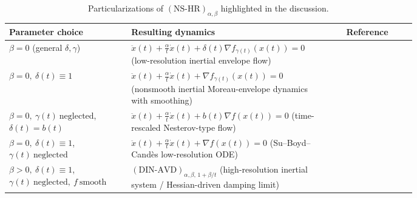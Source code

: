 \documentclass[11pt]{article}
\numberwithin{equation}{section}
\begin{document}
\begin{table}[t]
\centering
\caption{Particularizations of $(\mathrm{NS\text{-}HR})_{\alpha,\beta}$ highlighted in the discussion.}
\label{tab:particularizations_discussion}
\renewcommand{\arraystretch}{1.2}\centering
\begin{tabular}{p{0.30\linewidth} p{0.48\linewidth} c}
\hline
\textbf{Parameter choice} & \textbf{Resulting dynamics} & \textbf{Reference} \\
\hline

$\beta=0$ (general $\delta,\gamma$) 
&
$\ddot x(t)+\frac{\alpha}{t}\dot x(t)+\delta(t)\nabla f_{\gamma(t)}(x(t))=0$
(low-resolution inertial envelope flow)
& \cite{BotKarapetyants2022} \\\hline

$\beta=0,\ \delta(t)\equiv 1$ 
&
$\ddot x(t)+\frac{\alpha}{t}\dot x(t)+\nabla f_{\gamma(t)}(x(t))=0$
(nonsmooth inertial Moreau-envelope dynamics with smoothing)
& \cite{AttouchCabot2018JDE} \\ \hline

$\beta=0,\ \gamma(t)\ \text{neglected}$, \newline $\delta(t)=b(t)$
&
$\ddot x(t)+\frac{\alpha}{t}\dot x(t)+b(t)\nabla f(x(t))=0$
(time-rescaled Nesterov-type flow)
& \cite{AttouchRiahi2019} \\\hline

$\beta=0,\ \delta(t)\equiv 1$, \newline $ \gamma(t)\ \text{neglected}$
&
$\ddot x(t)+\frac{\alpha}{t}\dot x(t)+\nabla f(x(t))=0$
(Su--Boyd--Cand\`es low-resolution ODE)
& \cite{Su2016} \\\hline

$\beta>0,\ \delta(t)\equiv 1$, \newline $ \gamma(t)\ \text{neglected},\ f\ \text{smooth}$
&
$(\mathrm{DIN\text{-}AVD})_{\alpha,\beta,\,1+\beta/t}$
(high-resolution inertial system / Hessian-driven damping limit)
& \cite{AttouchChbani2022} \\

\hline
\end{tabular}
\end{table}
\end{document}
